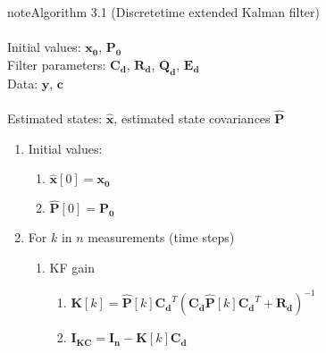 \label{04.01_EK:ek-algorithm} 
\noindent\begin{sphinxadmonition}{note}{Algorithm 3.1 (Discrete\sphinxhyphen{}time extended Kalman filter)} \\
 \\
\hspace*{0.5cm} Initial values: \(\mathbf{x_0}\), \(\mathbf{P_0}\) \\
\hspace*{0.5cm} Filter parameters: \(\mathbf{C_d}\), \(\mathbf{R_d}\), \(\mathbf{Q_d}\), \(\mathbf{E_d}\) \\
\hspace*{0.5cm} Data: \(\mathbf{y}\), \(\mathbf{c}\) \\
 \\
\hspace*{0.5cm} Estimated states: \(\mathbf{\hat{x}}\), estimated state covariances \(\mathbf{\hat{P}}\)
\vspace{0.2cm}
\begin{enumerate}
%
\item {} 
Initial values:
\begin{enumerate}
%
\item {} 

\(\mathbf{\hat{x}}[0] = \mathbf{x_0}\)

\item {} 

\(\mathbf{\hat{P}}[0] = \mathbf{P_0}\)

\end{enumerate}

\item {} 

For \(k\) in \(n\) measurements (time steps)
\begin{enumerate}
%
\item {} 

KF gain
\begin{enumerate}
%
\item {} 

\(\mathbf{K}[k]=\mathbf{\hat{P}}[k] \mathbf{C_d}^T \left(\mathbf{C_d} \mathbf{\hat{P}}[k] \mathbf{C_d}^T + \mathbf{R_d}\right)^{-1}\)

\item {} 

\(\mathbf{I_{KC}} = \mathbf{I_n} - \mathbf{K}[k] \mathbf{C_d}\)


\end{enumerate}
\end{enumerate}
\end{enumerate}
\end{sphinxadmonition}
